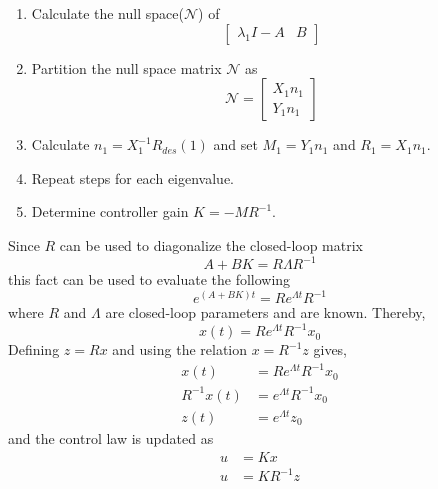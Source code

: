\begin{enumerate}
    \item Calculate the null space($\mathcal{N}$) of 
    \begin{equation}
        \begin{bmatrix}
            \lambda_1I-A& B
        \end{bmatrix}
    \end{equation}
    \item Partition the null space matrix $\mathcal{N}$ as 
    \begin{equation}
        \mathcal{N}=\begin{bmatrix}X_1n_1\\Y_1n_1\end{bmatrix}
    \end{equation}
    \item Calculate $n_1=X_1^{-1}R_{des}(1)$ and set $M_1=Y_1n_1$ and $R_1=X_1n_1$.
    \item Repeat steps for each eigenvalue.
    \item Determine controller gain $K=-MR^{-1}$.
\end{enumerate}

Since $R$ can be used to diagonalize the closed-loop matrix
\begin{equation}
    A+BK=R\Lambda R^{-1}
\end{equation}
this fact can be used to evaluate the following
\begin{equation}
    e^{(A+BK)t}=Re^{\Lambda t} R^{-1}
\end{equation}
where $R$ and $\Lambda$ are closed-loop parameters and are known. Thereby,
\begin{equation}
    x(t)=Re^{\Lambda t} R^{-1}x_0
\end{equation}
Defining $z=Rx$ and using the relation $x=R^{-1}z$ gives,
\begin{equation}
\begin{split}
    x(t)&=Re^{\Lambda t} R^{-1}x_0\\
    R^{-1}x(t)&=e^{\Lambda t} R^{-1}x_0\\
    z(t)&=e^{\Lambda t} z_0
\end{split}
\end{equation}
and the control law is updated as 
\begin{equation}
\begin{split}
    u&=Kx\\
    u&=KR^{-1}z
\end{split}
\end{equation}

